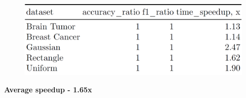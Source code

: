 \documentclass[aspectratio=169]{beamer}
\begin{document}
\begin{frame}
\begin{figure}
    \centering
    \includegraphics[width=1\linewidth]{../../fig/speedup_groupby.png}
\end{figure}
\textbf{Average speedup - 1.65{\rm x}}
    
\end{frame}
\end{document}
